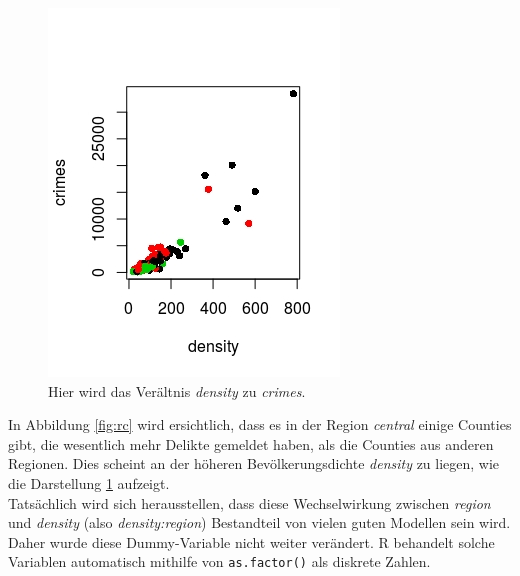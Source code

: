 \begin{figure}
\centering
\includegraphics[scale=0.7]{./jpgs/cdc.jpeg}
 \abovecaptionskip
\caption{Hier wird das Ver\"altnis \textit{density} zu \textit{crimes}.}
\label{fig:cdc}
\end{figure}


In Abbildung \ref{fig:rc} wird ersichtlich, dass es in der Region \textit{central} einige Counties gibt, die wesentlich mehr Delikte gemeldet haben, als die Counties aus anderen Regionen.
Dies scheint an der h\"oheren Bev\"olkerungsdichte \textit{density} zu liegen, wie die Darstellung \ref{fig:cdc} aufzeigt. \\
Tats\"achlich wird sich herausstellen, dass diese Wechselwirkung zwischen \textit{region} und \textit{density} (also \textit{density:region}) Bestandteil von vielen guten Modellen sein wird.
Daher wurde diese Dummy-Variable nicht weiter ver\"andert.
\textsf{R} behandelt solche Variablen automatisch mithilfe von \texttt{as.factor()} als diskrete Zahlen.


